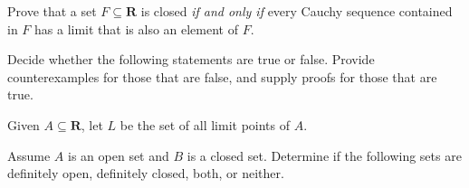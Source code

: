 \begin{exercise}
  Prove that a set $F \subseteq \mathbf{R}$ is closed \emph{if and only if} every Cauchy sequence contained in $F$ has a limit that is also an element of $F$.
\end{exercise}

\begin{solution}
  \TODO
\end{solution}

\begin{exercise}
  Decide whether the following statements are true or false. Provide counterexamples for those that are false, and supply proofs for those that are true.
\end{exercise}

\begin{solution}
  \enum{
  \item \TODO
  \item \TODO
  \item \TODO
  \item \TODO
  \item \TODO
  }
\end{solution}

\begin{exercise}
  Given $A \subseteq \mathbf{R}$, let $L$ be the set of all limit points of $A$.
\end{exercise}

\begin{solution}
  \enum{
  \item \TODO
  \item \TODO
  }
\end{solution}

\begin{exercise}
  Assume $A$ is an open set and $B$ is a closed set. Determine if the following sets are definitely open, definitely closed, both, or neither.
\end{exercise}

